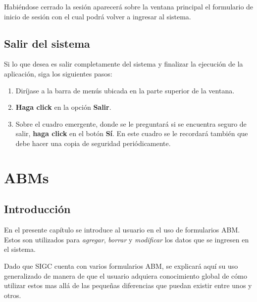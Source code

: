 \documentclass{book}
\begin{document}
Habiéndose cerrado la sesión aparecerá sobre la ventana principal el formulario de inicio de sesión con el cual podrá volver a ingresar al sistema.
\bigskip



\section{Salir del sistema}

Si lo que desea es salir completamente del sistema y finalizar la ejecución de la aplicación, siga los siguientes pasos:
\medskip

\begin{enumerate}
	\itemsep=8pt \topsep=0pt \partopsep=0pt \parskip=0pt \parsep=0pt
	
	\item Diríjase a la barra de menús ubicada en la parte superior de la ventana.

	\item \textbf{Haga click} en la opción \textbf{Salir}.

	\item Sobre el cuadro emergente, donde se le preguntará si se encuentra seguro de salir, \textbf{haga click} en el botón \textbf{Sí}. En este cuadro se le recordará también que debe hacer una copia de seguridad periódicamente.

\end{enumerate}
\medskip




%
%
\chapter{ABMs}


\section{Introducción}

En el presente capítulo se introduce al usuario en el uso de formularios ABM. Estos son utilizados para \textit{agregar}, \textit{borrar} y \textit{modificar} los datos que se ingresen en el sistema. 
\par
Dado que SIGC cuenta con varios formularios ABM, se explicará aquí su uso generalizado de manera de que el usuario adquiera conocimiento global de cómo utilizar estos mas allá de las pequeñas diferencias que puedan existir entre unos y otros.
\bigskip\bigskip
\end{document}
